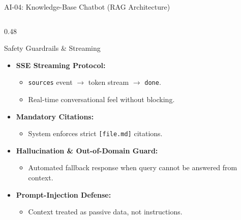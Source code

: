 \documentclass[aspectratio=169, 10pt]{beamer}
\begin{document}
\begin{frame}{AI-04: Knowledge-Base Chatbot (RAG Architecture)}
\begin{columns}[T]
    \begin{column}{0.48\textwidth}
      \begin{block}{Safety Guardrails \& Streaming}
        \begin{itemize}
          \item \textbf{SSE Streaming Protocol:}
            \begin{itemize}
              \item \texttt{sources} event $\rightarrow$ token stream $\rightarrow$ \texttt{done}.
              \item Real-time conversational feel without blocking.
            \end{itemize}
          \item \textbf{Mandatory Citations:}
            \begin{itemize}
              \item System enforces strict \texttt{[file.md]} citations.
            \end{itemize}
          \item \textbf{Hallucination \& Out-of-Domain Guard:}
            \begin{itemize}
              \item Automated fallback response when query cannot be answered from context.
            \end{itemize}
          \item \textbf{Prompt-Injection Defense:}
            \begin{itemize}
              \item Context treated as passive data, not instructions.
            \end{itemize}
        \end{itemize}
      \end{block}
    \end{column}
  \end{columns}
\end{frame}
\end{document}

